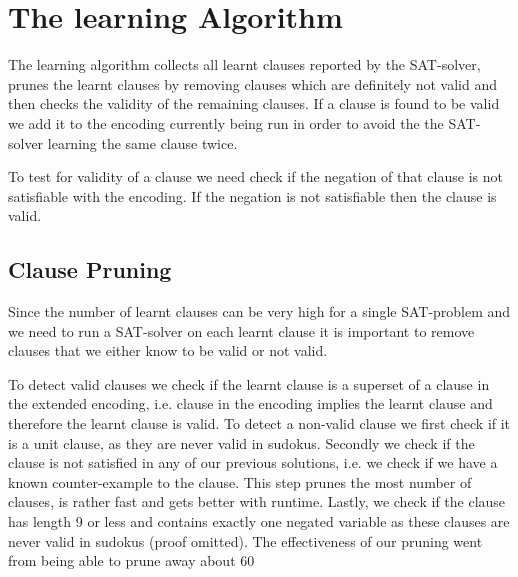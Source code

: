 \documentclass{article}
\begin{document}



\section{The learning Algorithm} \label{algorithm}
The learning algorithm collects all learnt clauses reported by the SAT-solver, prunes the learnt clauses by removing clauses which are definitely not valid and then checks the validity of the remaining clauses. If a clause is found to be valid we add it to the encoding currently being run in order to avoid the the SAT-solver learning the same clause twice.

To test for validity of a clause we need check if the negation of that clause is not satisfiable with the encoding. If the negation is not satisfiable then the clause is valid.
\subsection{Clause Pruning} \label{clause pruning}
Since the number of learnt clauses can be very high for a single SAT-problem and we need to run a SAT-solver on each learnt clause it is important to remove clauses that we either know to be valid or not valid.

To detect valid clauses we check if the learnt clause is a superset of a clause in the extended encoding, i.e. clause in the encoding implies the learnt clause and therefore the learnt clause is valid. To detect a non-valid clause we first check if it is a unit clause, as they are never valid in sudokus. Secondly we check if the clause is not satisfied in any of our previous solutions, i.e. we check if we have a known counter-example to the clause. This step prunes the most number of clauses, is rather fast and gets better with runtime. Lastly, we check if the clause has length 9 or less and contains exactly one negated variable as these clauses are never valid in sudokus (proof omitted). The effectiveness of our pruning went from being able to prune away about 60%
\end{document}
